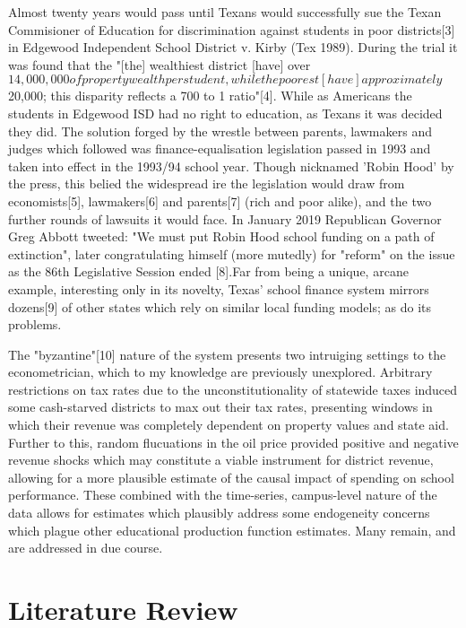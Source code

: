 \documentclass[11pt]{article}
\begin{document}
Almost twenty years would pass until Texans would successfully sue the Texan Commisioner of Education for discrimination against students in poor districts[3] in Edgewood Independent School District v. Kirby (Tex 1989). During the trial it was found that the "[the] wealthiest district [have] over $ 14,000,000 of property wealth per student, while the poorest [have] approximately $ 20,000; this disparity reflects a 700 to 1 ratio"[4]. While as Americans the students in Edgewood ISD had no right to education, as Texans it was decided they did. The solution forged by the wrestle between parents, lawmakers and judges which followed was finance-equalisation legislation passed in 1993 and taken into effect in the 1993/94 school year. Though nicknamed 'Robin Hood' by the press, this belied the widespread ire the legislation would draw from economists[5], lawmakers[6] and parents[7] (rich and poor alike), and the two further rounds of lawsuits it would face. In January 2019 Republican Governor Greg Abbott tweeted: "We must put Robin Hood school funding on a path of extinction", later congratulating himself (more mutedly) for "reform" on the issue as the 86th Legislative Session ended [8].Far from being a unique, arcane example, interesting only in its novelty, Texas' school finance system mirrors dozens[9] of other states which rely on similar local funding models; as do its problems.

The "byzantine"[10] nature of the system presents two intruiging settings to the econometrician, which to my knowledge are previously unexplored. Arbitrary restrictions on tax rates due to the unconstitutionality of statewide taxes induced some cash-starved districts to max out their tax rates, presenting windows in which their revenue was completely dependent on property values and state aid. Further to this, random flucuations in the oil price provided positive and negative revenue shocks which may constitute a viable instrument for district revenue, allowing for a more plausible estimate of the causal impact of spending on school performance. These combined with the time-series, campus-level nature of the data allows for estimates which plausibly address some endogeneity concerns which plague other educational production function estimates. Many remain, and are addressed in due course.


\section{Literature Review}
\label{s:next}
\end{document}
